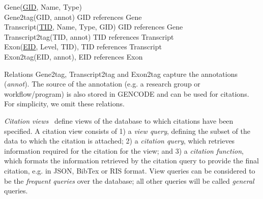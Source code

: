 \begin{tabbing}
Gene(\underline{GID}, Name, Type)\\
Gene2tag(GID, annot) GID references Gene\\
Transcript(\underline{TID}, Name, Type, GID) GID references Gene\\
Transcript2tag(TID, annot) TID references Transcript\\
Exon(\underline{EID}, Level, TID), TID references Transcript\\
Exon2tag(EID, annot), EID references Exon
\end{tabbing}
Relations Gene2tag, Transcript2tag and Exon2tag capture the annotations ({\em annot}). 
The source of the annotation (e.g. a research group or workflow/program) is also stored in GENCODE and can be used for citations.  For simplicity, we omit these relations.

\textit{Citation views}~\cite{davidson2017model} define views of the database to which citations have been specified.  A citation view consists of 1) a \textit{view query}, defining the subset of the data to which the citation is attached; 2) a \textit{citation query}, which retrieves information required for the citation for the view; and 3) a \textit{citation function}, which formats the information retrieved by the citation query to provide the final citation, e.g. in JSON, BibTex or RIS format. View queries can be considered to be the \textit{frequent queries} over the database; all other queries will be called \textit{general} queries.

